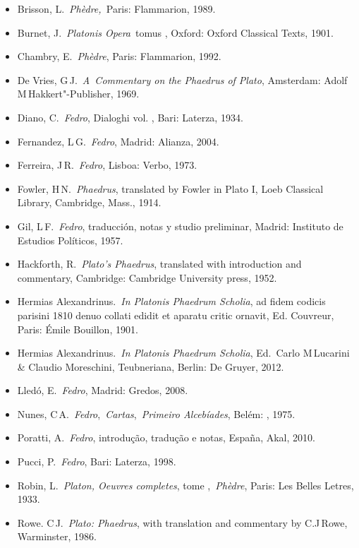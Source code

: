 \begin{itemize}
\itemsep1pt\parskip0pt
\item
  Brisson, L.~\emph{Phèdre,~}Paris: Flammarion, 1989.
\item
  Burnet, J.~\emph{Platonis Opera}~tomus , Oxford: Oxford Classical
  Texts, 1901.
\item
  Chambry, E.~\emph{Phèdre}, Paris: Flammarion, 1992.
\item
  De Vries, G\,J.~\emph{A~Commentary on the Phaedrus of Plato},
  Amsterdam: Adolf M\,Hakkert"-Publisher, 1969.
\item
  Diano, C.~\emph{Fedro}, Dialoghi vol. , Bari: Laterza, 1934.
\item
  Fernandez, L\,G.~\emph{Fedro}, Madrid: Alianza, 2004.
\item
  Ferreira, J\,R.~\emph{Fedro}, Lisboa: Verbo, 1973.
\item
  Fowler, H\,N.~\emph{Phaedrus}, translated by Fowler in Plato I, Loeb
  Classical Library, Cambridge, Mass., 1914.
\item
  Gil, L\,F.~\emph{Fedro}, traducción, notas y studio preliminar,
  Madrid: Instituto de Estudios Políticos, 1957.
\item
  Hackforth, R.~\emph{Plato's Phaedrus}, translated with introduction
  and commentary, Cambridge: Cambridge University press, 1952.
\item
  Hermias Alexandrinus.~\emph{In Platonis Phaedrum Scholia}, ad fidem
  codicis parisini 1810 denuo collati edidit et aparatu critic ornavit,
  Ed. Couvreur, Paris: Émile Bouillon, 1901.
\item
  Hermias Alexandrinus.~\emph{In Platonis Phaedrum Scholia}, Ed.~Carlo
  M\,Lucarini \& Claudio Moreschini, Teubneriana, Berlin: De Gruyer,
  2012.
\item
  Lledó, E.~\emph{Fedro}, Madrid: Gredos, 2008.
\item
  Nunes, C\,A.~\emph{Fedro},~\emph{Cartas},~\emph{Primeiro Alcebíades},
  Belém: , 1975.
\item
  Poratti, A.~\emph{Fedro}, introdução, tradução e notas, España, Akal,
  2010.
\item
  Pucci, P.~\emph{Fedro}, Bari: Laterza, 1998.
\item
  Robin, L.~\emph{Platon, Oeuvres completes}, tome ,~\emph{Phèdre},
  Paris: Les Belles Letres, 1933.
\item
  Rowe. C\,J.~\emph{Plato: Phaedrus}, with translation and commentary by
  C.J\,Rowe, Warminster, 1986.

\end{itemize}
